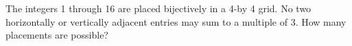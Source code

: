 The integers 1 through 16 are placed bijectively in a 4-by 4 grid. No two horizontally or vertically adjacent entries may sum to a multiple of 3. How many placements are possible?
